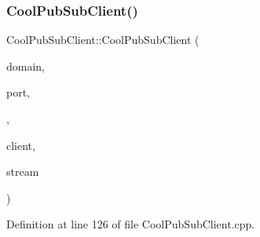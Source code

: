 \subsubsection{\texorpdfstring{Cool\+Pub\+Sub\+Client()}{CoolPubSubClient()}\hspace{0.1cm}{\footnotesize\ttfamily [14/14]}}
{\footnotesize\ttfamily Cool\+Pub\+Sub\+Client\+::\+Cool\+Pub\+Sub\+Client (\begin{DoxyParamCaption}\item[{const char $\ast$}]{domain,  }\item[{uint16\+\_\+t}]{port,  }\item[{\hyperlink{class_cool_pub_sub_client_a021ec75e9fbaf658370b8005ccfddc14}{M\+Q\+T\+T\+\_\+\+C\+A\+L\+L\+B\+A\+C\+K\+\_\+\+S\+I\+G\+N\+A\+T\+U\+RE}}]{,  }\item[{Client \&}]{client,  }\item[{Stream \&}]{stream }\end{DoxyParamCaption})}



Definition at line 126 of file Cool\+Pub\+Sub\+Client.\+cpp.


